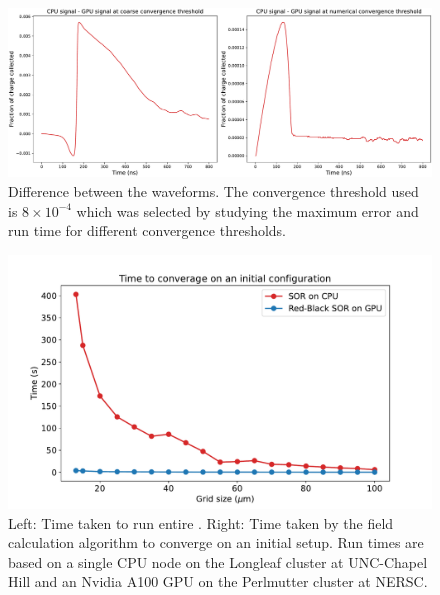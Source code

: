 \begin{figure}[!ht]
\centering
 \includegraphics[width=0.99\linewidth]{ch4/figs/converge_threshold_dif.pdf}
\caption{Difference between the waveforms. The convergence threshold used is $8\times10^{-4}$ which was selected by studying the maximum error and run time for different convergence thresholds.}
\label{fig:cov_thres_diff} 
\end{figure}


\begin{figure}[!ht]
\centering
 \includegraphics[width=0.99\linewidth]{ch4/figs/sor_cpu_gpu_comp.pdf}
\caption{\label{fig:sor_run_time} Left: Time taken to run entire {\tdsim}. Right: Time taken by the field calculation algorithm to converge on an initial setup. Run times are based on a single CPU node on the Longleaf cluster at UNC-Chapel Hill and an Nvidia A100 GPU on the Perlmutter cluster at NERSC.}
\end{figure}


